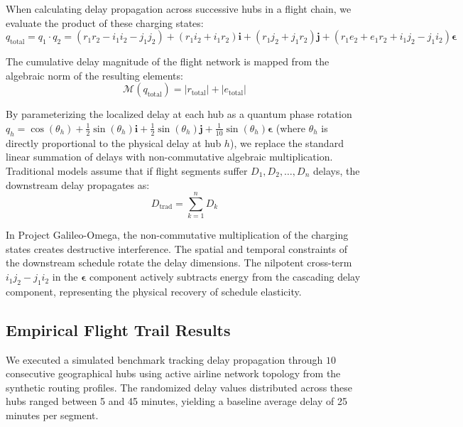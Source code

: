 \documentclass[11pt,a4paper]{book}
\begin{document}
When calculating delay propagation across successive hubs in a flight chain, we evaluate the product of these charging states:
\begin{equation}
\label{eq:charge_product}
q_{\text{total}} = q_1 \cdot q_2 = (r_1 r_2 - i_1 i_2 - j_1 j_2) + (r_1 i_2 + i_1 r_2)\mathbf{i} + (r_1 j_2 + j_1 r_2)\mathbf{j} + (r_1 e_2 + e_1 r_2 + i_1 j_2 - j_1 i_2)\bm{\epsilon}
\end{equation}

The cumulative delay magnitude of the flight network is mapped from the algebraic norm of the resulting elements:
\begin{equation}
\label{eq:delay_magnitude}
\mathcal{M}(q_{\text{total}}) = |r_{\text{total}}| + |e_{\text{total}}|
\end{equation}

By parameterizing the localized delay at each hub as a quantum phase rotation $q_h = \cos(\theta_h) + \frac{1}{2}\sin(\theta_h)\mathbf{i} + \frac{1}{2}\sin(\theta_h)\mathbf{j} + \frac{1}{10}\sin(\theta_h)\bm{\epsilon}$ (where $\theta_h$ is directly proportional to the physical delay at hub $h$), we replace the standard linear summation of delays with non-commutative algebraic multiplication. Traditional models assume that if flight segments suffer $D_1, D_2, \dots, D_n$ delays, the downstream delay propagates as:
\begin{equation}
\label{eq:traditional_delay_sum}
D_{\text{trad}} = \sum_{k=1}^n D_k
\end{equation}

In Project Galileo-Omega, the non-commutative multiplication of the charging states creates destructive interference. The spatial and temporal constraints of the downstream schedule rotate the delay dimensions. The nilpotent cross-term $i_1 j_2 - j_1 i_2$ in the $\bm{\epsilon}$ component actively subtracts energy from the cascading delay component, representing the physical recovery of schedule elasticity.

\subsection{Empirical Flight Trail Results}\label{subsec:empirical_trail_results}

We executed a simulated benchmark tracking delay propagation through $10$ consecutive geographical hubs using active airline network topology from the synthetic routing profiles. The randomized delay values distributed across these hubs ranged between 5 and 45 minutes, yielding a baseline average delay of 25 minutes per segment.
\end{document}
